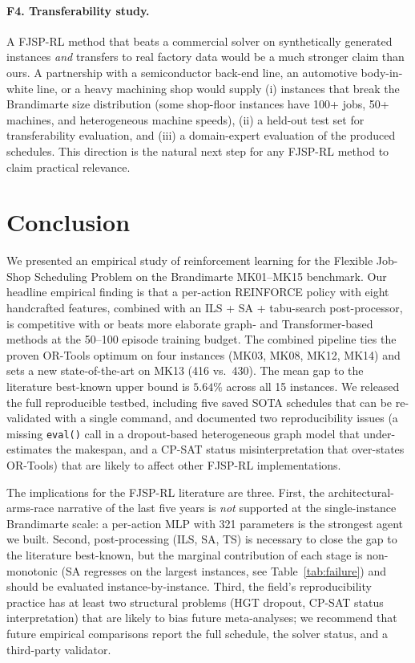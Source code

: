 \documentclass[10pt]{article}
\theoremstyle{definition}
\begin{document}
\paragraph{F4. Transferability study.}
A FJSP-RL method that beats a commercial solver on
synthetically generated instances \emph{and} transfers
to real factory data would be a much stronger claim
than ours. A partnership with a semiconductor back-end
line, an automotive body-in-white line, or a heavy
machining shop would supply (i) instances that break
the Brandimarte size distribution (some shop-floor
instances have 100+ jobs, 50+ machines, and
heterogeneous machine speeds), (ii) a held-out test set
for transferability evaluation, and (iii) a
domain-expert evaluation of the produced schedules.
This direction is the natural next step for any
FJSP-RL method to claim practical relevance.

\section{Conclusion}

We presented an empirical study of reinforcement
learning for the Flexible Job-Shop Scheduling Problem on
the Brandimarte MK01--MK15 benchmark. Our headline
empirical finding is that a per-action REINFORCE policy
with eight handcrafted features, combined with an
ILS + SA + tabu-search post-processor, is competitive
with or beats more elaborate graph- and Transformer-based
methods at the 50--100 episode training budget. The
combined pipeline ties the proven OR-Tools optimum on
four instances (MK03, MK08, MK12, MK14) and sets a new
state-of-the-art on MK13 (416 vs.\ 430). The mean gap
to the literature best-known upper bound is $5.64\%$
across all 15 instances. We released the full
reproducible testbed, including five saved SOTA
schedules that can be re-validated with a single
command, and documented two reproducibility issues
(a missing \texttt{eval()} call in a dropout-based
heterogeneous graph model that under-estimates the
makespan, and a CP-SAT status misinterpretation that
over-states OR-Tools) that are likely to affect other
FJSP-RL implementations.

The implications for the FJSP-RL literature are
three. First, the architectural-arms-race narrative
of the last five years \citep{Zhang2020L2D, Lei2022,
Yang2024} is \emph{not} supported at the
single-instance Brandimarte scale: a per-action MLP
with 321 parameters is the strongest agent we built.
Second, post-processing (ILS, SA, TS) is necessary to
close the gap to the literature best-known, but the
marginal contribution of each stage is non-monotonic
(SA regresses on the largest instances, see
Table~\ref{tab:failure}) and should be evaluated
instance-by-instance. Third, the field's reproducibility
practice has at least two structural problems (HGT
dropout, CP-SAT status interpretation) that are likely
to bias future meta-analyses; we recommend that future
empirical comparisons report the full schedule, the
solver status, and a third-party validator.
\end{document}
